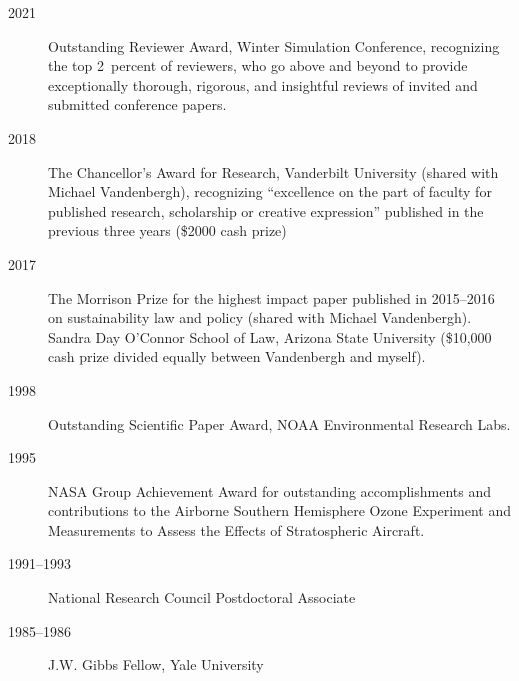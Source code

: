\begin{description}
\item[2021] Outstanding Reviewer Award, Winter Simulation Conference,
recognizing the top 2~percent of reviewers, who go above and beyond to provide
exceptionally thorough, rigorous, and insightful reviews of invited and
submitted conference papers.
\item[2018] The Chancellor's Award for Research, Vanderbilt University (shared
with Michael Vandenbergh), recognizing ``excellence on the part of faculty for
published research, scholarship or creative expression'' published in the
previous three years (\$2000 cash prize)
\item[2017] The Morrison Prize for the highest impact paper published in
2015--2016 on sustainability law and policy (shared with Michael Vandenbergh).
Sandra Day O'Connor School of Law, Arizona State University (\$10,000 cash
prize divided equally between Vandenbergh and myself).
\item[1998] Outstanding Scientific Paper Award, NOAA Environmental Research
Labs.
\item[1995] NASA Group Achievement Award for outstanding accomplishments and
contributions to the Airborne Southern Hemisphere Ozone Experiment and
Measurements to Assess the Effects of Stratospheric Aircraft.
\item[1991--1993] National Research Council Postdoctoral Associate
\item[1985--1986] J.W. Gibbs Fellow, Yale University
\end{description}
